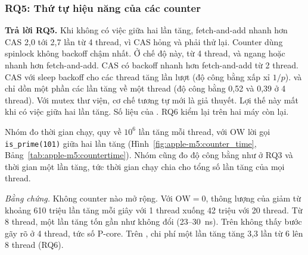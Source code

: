 \subsubsection{RQ5: Thứ tự hiệu năng của các counter}

\begin{rqanswer}\textbf{Trả lời RQ5.} Khi không có việc giữa hai lần tăng, fetch-and-add nhanh hơn CAS
2,0 tới 2,7 lần từ 4 thread, vì CAS hỏng và phải thử lại. Counter dùng spinlock không backoff chậm
nhất. Ở chế độ này, từ 4 thread,  và  ngang hoặc nhanh hơn
fetch-and-add. CAS có backoff nhanh hơn fetch-and-add từ 2 thread. CAS với sleep backoff cho các thread
tăng lần lượt (độ công bằng xấp xỉ $1/p$).  và  chỉ dồn một phần các
lần tăng về một thread (độ công bằng 0,52 và 0,39 ở 4 thread). Với mutex thư viện, cơ chế tương tự mới là
giả thuyết. Lợi thế này mất khi có việc giữa hai lần tăng. Số liệu của . RQ6 kiểm lại
trên hai máy còn lại.\end{rqanswer}

Nhóm đo thời gian chạy, quy về $10^6$ lần tăng mỗi thread, với $\mathrm{OW}$ lời gọi
\texttt{is\_prime(101)} giữa hai lần tăng (Hình~\ref{fig:apple-m5:counter_time},
Bảng~\ref{tab:apple-m5:countertime}). Nhóm cũng đo độ công bằng như ở RQ3 và thời gian một lần tăng, tức
thời gian chạy chia cho tổng số lần tăng của mọi thread.


\emph{Bằng chứng.} Không counter nào mở rộng. Với $\mathrm{OW} = 0$, thông lượng của  giảm từ
khoảng 610 triệu lần tăng mỗi giây với 1 thread xuống 42 triệu với 20 thread. Từ 8 thread, một lần tăng
tốn gần như không đổi (23--30~ns). Trên  không thấy bước gãy rõ ở 4 thread, tức số
P-core. Trên , chi phí một lần tăng tăng 3,3 lần từ 6 lên 8 thread (RQ6).

